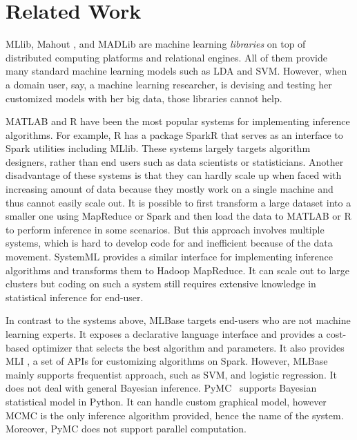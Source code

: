 
\section{Related Work}
\label{sec:related}

MLlib, Mahout \cite{mahout}, and MADLib \cite{madlib} are machine learning \emph{libraries} 
on top of distributed computing platforms and relational engines.
All of them provide many standard machine learning models such as LDA and SVM.
However, when a domain user, say, a machine learning researcher,
is devising and testing her customized models with her big data,
those libraries cannot help.

MATLAB and R have been the most popular systems for implementing inference algorithms. 
For example, R has a package SparkR that serves as an interface to Spark utilities including MLlib.
These systems largely targets algorithm designers, rather than end users
such as data scientists or statisticians.
Another disadvantage of these systems is that they can hardly scale up
when faced with increasing amount of data
because they mostly work on a single machine and thus cannot easily scale out.
It is possible to first transform a large dataset into a smaller one
using MapReduce or Spark and then load the data to MATLAB or R to perform inference %
in some scenarios. But this approach involves multiple systems, which is hard to
develop code for and inefficient because of the data movement.
SystemML \cite{systemml} provides a similar interface for implementing inference
algorithms and transforms them to Hadoop MapReduce. It can scale out to large
clusters but coding on such a system still requires extensive knowledge in
statistical inference for end-user.

In contrast to the systems above, MLBase \cite{mlbase}
targets end-users who are not machine learning experts.
It exposes a declarative language interface and
provides a cost-based optimizer that selects the best algorithm and
parameters. It also provides MLI \cite{mli}, a set of APIs for customizing algorithms on
Spark. However, MLBase mainly supports frequentist approach, such as SVM,
and logistic regression. It does not deal with general Bayesian inference.
PyMC~\cite{patil2010pymc} supports Bayesian statistical model in Python.  It can handle custom
graphical model, however MCMC is the only inference algorithm provided, hence
the name of the system.  Moreover, PyMC does not support parallel computation.

